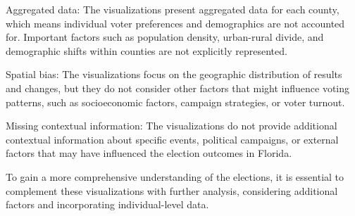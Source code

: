 \documentclass[
]{article}
\begin{document}
Aggregated data: The visualizations present aggregated data for each
county, which means individual voter preferences and demographics are
not accounted for. Important factors such as population density,
urban-rural divide, and demographic shifts within counties are not
explicitly represented.

Spatial bias: The visualizations focus on the geographic distribution of
results and changes, but they do not consider other factors that might
influence voting patterns, such as socioeconomic factors, campaign
strategies, or voter turnout.

Missing contextual information: The visualizations do not provide
additional contextual information about specific events, political
campaigns, or external factors that may have influenced the election
outcomes in Florida.

To gain a more comprehensive understanding of the elections, it is
essential to complement these visualizations with further analysis,
considering additional factors and incorporating individual-level data.
\end{document}
